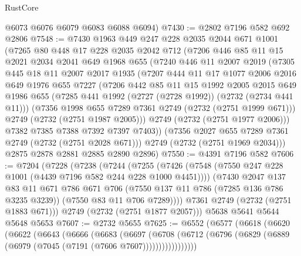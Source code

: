\begin{lexlean}{RustCore}
\begin{coremodule}
      @6073
      @6076
      @6079
      @6083
      @6088
      @6094)
@7430 := @2802 @7196 @582 @692 @2806
@7548 := @7430
    @1963
    @449
    @247
    @228
    @2035
    @2044
    @671
    @1001
    (@7265
      @80
      @448
      @17
      @228
      @2035
      @2042
      @712
      (@7206
        @446
        @85
        @11
        @15
        @2021
        @2034
        @2041
        @649
        @1968
        @655
        (@7240
          @446
          @11
          @2007
          @2019
          (@7305
            @445
            @18
            @11
            @2007
            @2017
            @1935
            (@7207
              @444
              @11
              @17
              @1077
              @2006
              @2016
              @649
              @1976
              @655
              @7227
              (@7206
                @442
                @85
                @11
                @15
                @1992
                @2005
                @2015
                @649
                @1986
                @655
                (@7285 @441 @1992 (@2727 (@2728 @1992)) (@2732 (@2734 @441 @11)))
                (@7356 @1998 @655 @7289 @7361 @2749 (@2732 (@2751 @1999 @671)))
                @2749
                (@2732 (@2751 @1987 @2005)))
              @2749
              (@2732 (@2751 @1977 @2006)))
            @7382
            @7385
            @7388
            @7392
            @7397
            @7403))
        (@7356 @2027 @655 @7289 @7361 @2749 (@2732 (@2751 @2028 @671)))
        @2749
        (@2732 (@2751 @1969 @2034)))
      @2875
      @2878
      @2881
      @2885
      @2890
      @2896)
@7550 := @4391 @7196 @582
@7606 := @7204
    (@7228
      (@7238
        (@7244
          (@7255
            (@7426 (@7548 (@7550 @247 @228 @1001 (@4439 @7196 @582 @244 @228 @1000 @4451))))
            (@7430
              @2047
              @137
              @83
              @11
              @671
              @786
              @671
              @706
              (@7550 @137 @11 @786 (@7285 @136 @786 @3235 @3239))
              (@7550 @83 @11 @706 @7289))))
        @7361
        @2749
        (@2732 (@2751 @1883 @671)))
      @2749
      (@2732 (@2751 @1877 @2057)))
    @5638
    @5641
    @5644
    @5648
    @5653
@7607 := @2732 @5655
@7625 := @6552
    (@6577
      (@6618
        (@6620
          (@6622
            (@6643
              (@6666
                (@6683
                  (@6697
                    (@6708
                      (@6712 (@6796 (@6829 (@6889 (@6979 (@7045 (@7191 (@7606 @7607)))))))))))))))))

\end{coremodule}
\end{lexlean}
